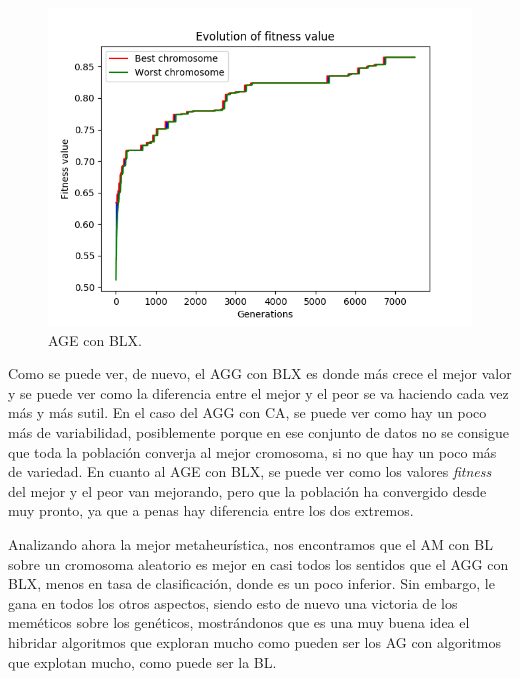 \documentclass[11pt,a4paper]{article}
\begin{document}
\begin{figure}[H]
\centering
\includegraphics[scale=0.6]{img/age-blx-texture.png}
\caption{AGE con BLX.}
\end{figure}

Como se puede ver, de nuevo, el AGG con BLX es donde más crece el mejor valor y se puede ver como la diferencia entre el mejor
y el peor se va haciendo cada vez más y más sutil. En el caso del AGG con CA, se puede ver como hay un poco más de variabilidad,
posiblemente porque en ese conjunto de datos no se consigue que toda la población converja al mejor cromosoma, si no que hay
un poco más de variedad. En cuanto al AGE con BLX, se puede ver como los valores \textit{fitness} del mejor y el peor van
mejorando, pero que la población ha convergido desde muy pronto, ya que a penas hay diferencia entre los dos extremos.

Analizando ahora la mejor metaheurística, nos encontramos que el AM con BL sobre un cromosoma aleatorio es mejor en casi todos
los sentidos que el AGG con BLX, menos en tasa de clasificación, donde es un poco inferior. Sin embargo, le gana en todos los
otros aspectos, siendo esto de nuevo una victoria de los meméticos sobre los genéticos, mostrándonos que es una muy buena idea
el hibridar algoritmos que exploran mucho como pueden ser los AG con algoritmos que explotan mucho, como puede ser la BL.
\end{document}
